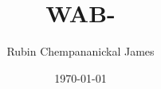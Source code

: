 %
%

\newcommand{\fullname}{Rubin Chempananickal James}
\newcommand{\email}{rubin.chempananickaljames@stud-provadis-hochschule.de}
\newcommand{\matnr}{D876}
\newcommand{\telMobil}{+49 176 27693100}
\newcommand{\fakultaet}{Informatik}

\newcommand{\titel}{WAB\\
LoRaWAN vs NB-IoT: Comparing Unlicensed vs Licensed LPWAN-Technologies}
\newcommand{\unternehmen}{ }

\newcommand{\abgabedatum}{13.02.2026}

\newcommand{\refFirst}{Prof. Dr. Eric Hutter}
\newcommand{\refSecond}{ }

\title{WAB- \unternehmen }
\author{\fullname}
\date{\today}
